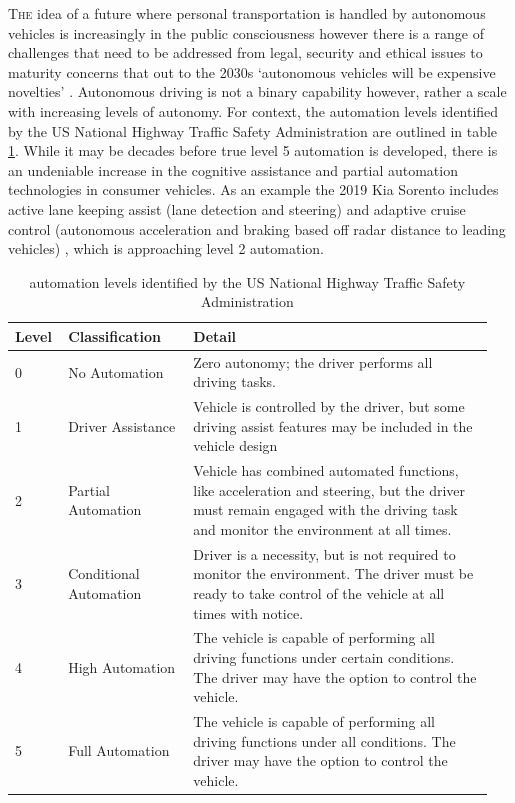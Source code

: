 \documentclass[]{aiaa-tc}%
\begin{document}
\lettrine[nindent=0pt]{T}{he} idea of a future where personal transportation is handled by autonomous vehicles is increasingly in the public consciousness however there is a range of challenges that need to be addressed from legal, security and ethical issues \citep{gmReport} to maturity concerns that out to the 2030s `autonomous vehicles will be expensive novelties' \citep{vicTransportImplications}. Autonomous driving is not a binary capability however, rather a scale with increasing levels of autonomy. For context, the automation levels identified by the US National Highway Traffic Safety Administration \citep{automationVisionForSafety} are outlined in table \ref{t:automationLevels}. While it may be decades before true level 5 automation is developed, there is an undeniable increase in the cognitive assistance and partial automation technologies in consumer vehicles. As an example the 2019 Kia Sorento includes active lane keeping assist (lane detection and steering) and adaptive cruise control (autonomous acceleration and braking based off radar distance to leading vehicles) \citep{kia}, which is approaching level 2 automation. 


\begin{table}
 \begin{center}
  \caption{automation levels identified by the US National Highway Traffic Safety Administration \citep{automationVisionForSafety}}
  \label{t:automationLevels}
  \begin{tabular}{p{0.1\linewidth}p{0.25\linewidth}p{0.6\linewidth}}
       Level & Classification & Detail\\\hline
        0 &  No Automation & Zero autonomy; the driver performs all driving tasks. \\
       1 &  Driver Assistance & Vehicle is controlled by the driver, but some driving assist features may be included in the vehicle design \\
       2 &  Partial Automation & Vehicle has combined automated functions, like acceleration and steering, but the driver must remain engaged with the driving task and monitor the environment at all times. \\
       3 &  Conditional Automation &   Driver is a necessity, but is not required to monitor the environment. The driver must be ready to take control of the vehicle at all times with notice. \\
      4 &  High Automation &   The vehicle is capable of performing all driving functions under certain conditions. The driver may have the option to control the vehicle. \\
      5 &   Full Automation &   The vehicle is capable of performing all driving functions under all conditions. The driver may have the option to control the vehicle. 
  \end{tabular}
 \end{center}
\end{table}
\end{document}
